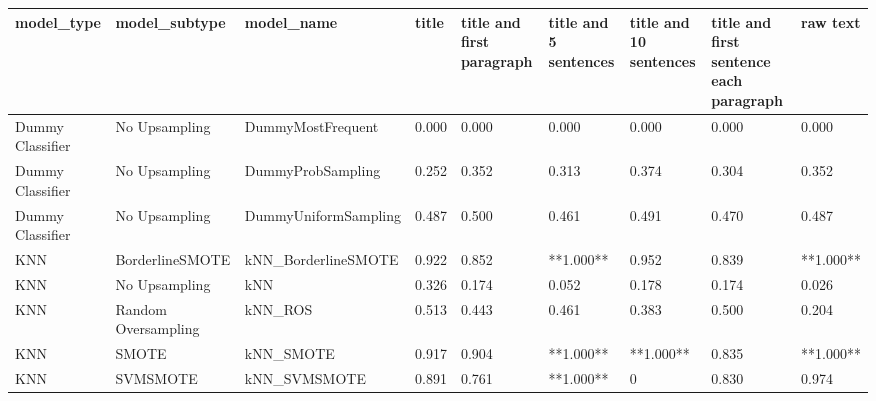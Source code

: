 \begin{tabular}{lllllllll}
\toprule
                  model\_type &       model\_subtype &                                   model\_name & title & title and first paragraph & title and 5 sentences & title and 10 sentences & title and first sentence each paragraph &  raw text \\
\midrule
            Dummy Classifier &       No Upsampling &                            DummyMostFrequent & 0.000 &                     0.000 &                 0.000 &                  0.000 &                                   0.000 &     0.000 \\
            Dummy Classifier &       No Upsampling &                            DummyProbSampling & 0.252 &                     0.352 &                 0.313 &                  0.374 &                                   0.304 &     0.352 \\
            Dummy Classifier &       No Upsampling &                         DummyUniformSampling & 0.487 &                     0.500 &                 0.461 &                  0.491 &                                   0.470 &     0.487 \\
                         KNN &     BorderlineSMOTE &                          kNN\_BorderlineSMOTE & 0.922 &                     0.852 &             **1.000** &                  0.952 &                                   0.839 & **1.000** \\
                         KNN &       No Upsampling &                                          kNN & 0.326 &                     0.174 &                 0.052 &                  0.178 &                                   0.174 &     0.026 \\
                         KNN & Random Oversampling &                                      kNN\_ROS & 0.513 &                     0.443 &                 0.461 &                  0.383 &                                   0.500 &     0.204 \\
                         KNN &               SMOTE &                                    kNN\_SMOTE & 0.917 &                     0.904 &             **1.000** &              **1.000** &                                   0.835 & **1.000** \\
                         KNN &            SVMSMOTE &                                 kNN\_SVMSMOTE & 0.891 &                     0.761 &             **1.000** &                      0 &                                   0.830 &     0.974 \\

\end{tabular}
